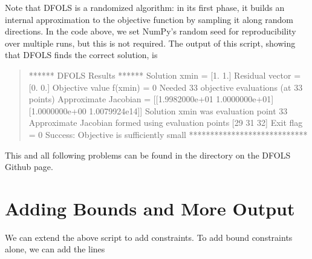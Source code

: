 \documentclass[letterpaper,10pt,english]{sphinxmanual}
\begin{document}
\sphinxAtStartPar
Note that DFO\sphinxhyphen{}LS is a randomized algorithm: in its first phase, it builds an internal approximation to the objective function by sampling it along random directions. In the code above, we set NumPy’s random seed for reproducibility over multiple runs, but this is not required. The output of this script, showing that DFO\sphinxhyphen{}LS finds the correct solution, is
\begin{quote}

\begin{sphinxVerbatim}[commandchars=\\\{\}]
****** DFO\PYGZhy{}LS Results ******
Solution xmin = [1. 1.]
Residual vector = [0. 0.]
Objective value f(xmin) = 0
Needed 33 objective evaluations (at 33 points)
Approximate Jacobian = [[\PYGZhy{}1.9982000e+01  1.0000000e+01]
 [\PYGZhy{}1.0000000e+00  1.0079924e\PYGZhy{}14]]
Solution xmin was evaluation point 33
Approximate Jacobian formed using evaluation points [29 31 32]
Exit flag = 0
Success: Objective is sufficiently small
****************************
\end{sphinxVerbatim}
\end{quote}

\sphinxAtStartPar
This and all following problems can be found in the  directory on the DFO\sphinxhyphen{}LS Github page.


\section{Adding Bounds and More Output}
\label{\detokenize{userguide:adding-bounds-and-more-output}}
\sphinxAtStartPar
We can extend the above script to add constraints. To add bound constraints alone, we can add the lines
\begin{quote}

\begin{sphinxVerbatim}[commandchars=\\\{\}]
  \PYG{p}{[} \PYG{p}{]}
  \PYG{p}{[} \PYG{p}{]}

     
\end{sphinxVerbatim}
\end{quote}
\end{document}
